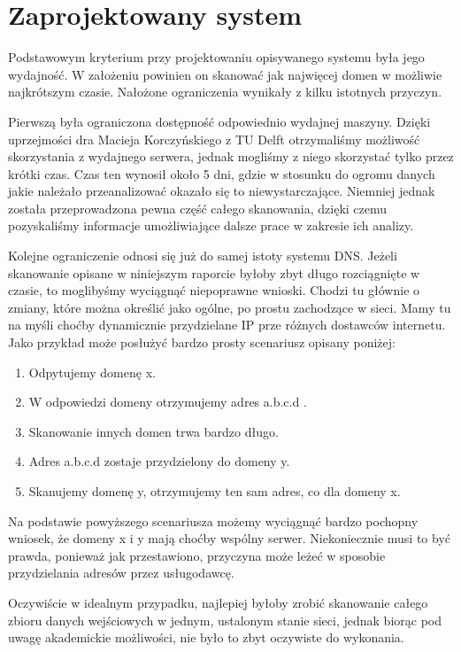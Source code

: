 \section{Zaprojektowany system}

Podstawowym kryterium przy projektowaniu opisywanego systemu była jego wydajność. W założeniu powinien on skanować jak najwięcej domen w możliwie najkrótszym czasie. Nałożone ograniczenia wynikały z kilku istotnych przyczyn. 

Pierwszą była ograniczona dostępność odpowiednio wydajnej maszyny. Dzięki uprzejmości dra Macieja Korczyńskiego z TU Delft otrzymaliśmy możliwość skorzystania z wydajnego serwera, jednak mogliśmy z niego skorzystać tylko przez krótki czas. Czas ten wynosił około 5 dni, gdzie w stosunku do ogromu danych jakie należało przeanalizować okazało się to niewystarczające. Niemniej jednak została przeprowadzona pewna część całego skanowania, dzięki czemu pozyskaliśmy informacje umożliwiające dalsze prace w zakresie ich analizy. 

Kolejne ograniczenie odnosi się już do samej istoty systemu DNS. Jeżeli skanowanie opisane w niniejszym raporcie byłoby zbyt długo rozciągnięte w czasie, to moglibyśmy wyciągnąć niepoprawne wnioski. Chodzi tu głównie o zmiany, które można określić jako ogólne, po prostu zachodzące w sieci. Mamy tu na myśli choćby dynamicznie przydzielane IP prze różnych dostawców internetu. Jako przykład może posłużyć bardzo prosty scenariusz opisany poniżej:
\begin{enumerate}
    \item Odpytujemy domenę x.
    \item W odpowiedzi domeny otrzymujemy adres a.b.c.d .
    \item Skanowanie innych domen trwa bardzo długo.
    \item Adres a.b.c.d zostaje przydzielony do domeny y.
    \item Skanujemy domenę y, otrzymujemy ten sam adres, co dla domeny x.
\end{enumerate}
Na podstawie powyższego scenariusza możemy wyciągnąć bardzo pochopny wniosek, że domeny x i y mają choćby wspólny serwer. Niekoniecznie musi to być prawda, ponieważ jak przestawiono, przyczyna może leżeć w sposobie przydzielania adresów przez usługodawcę. 

Oczywiście w idealnym przypadku, najlepiej byłoby zrobić skanowanie całego zbioru danych wejściowych w jednym, ustalonym stanie sieci, jednak biorąc pod uwagę akademickie możliwości, nie było to zbyt oczywiste do wykonania.

